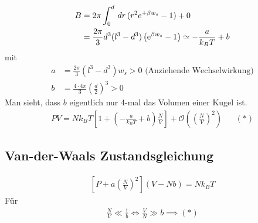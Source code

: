 %
\begin{align*}
  B & = 2 \pi \int_{0}^{d} \,dr\, (r^2 e ^{+ \beta w_s} - 1 ) + 0 \\
    & = \frac{2 \pi}{3} d^3 (l^3  - d^3) \left(\mathrm{e}^{\beta w_s} - 1 \right)
  \simeq - \frac{a}{k_B T} + b
\end{align*}
%
mit %
\begin{align*}
  a & = \frac{2\pi}{3} (l^3 - d^3) w_s > 0 \text{ (Anziehende Wechselwirkung)}\\ 
  b & = \frac{4 \cdot 4 \pi}{3} \left( \frac{d}{2} \right)^3 > 0
\end{align*}
%
Man sieht, dass $b$ eigentlich nur 4-mal das Volumen einer Kugel ist.
%
\begin{align*}
  P V = N k_B T \left[ 1 + \left(  - \frac{a}{k_B T} + b \right) 
  \frac{N}{V}\right] + \mathcal{O}\left( \left( \frac{N}{V} \right)^2 \right) && (*)
\end{align*}
%
\subsection*{Van-der-Waals Zustandsgleichung}
%
\begin{align*}
  \left[ P + a\left( \frac{N}{V} \right)^2 \right] ( V - N b) = N k_B T
\end{align*}
%
F\"ur
%
\begin{align*}
  \frac{N}{V} \ll 
  \frac{1}{b} \iff
  \frac{V}{N} \gg b \implies
  (*)
\end{align*}
